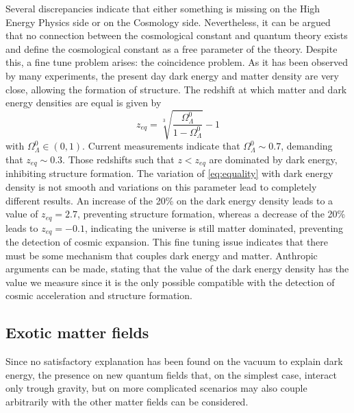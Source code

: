Several discrepancies indicate that either something is missing on the High Energy Physics side or on the Cosmology side. Nevertheless, it can be argued that no connection between the cosmological constant and quantum theory exists and define the cosmological constant as a free parameter of the theory. Despite this, a fine tune problem arises: the coincidence problem. As it has been observed by many experiments, the present day dark energy and matter density are very close, allowing the formation of structure. The redshift at which matter and dark energy densities are equal is given by
\begin{equation}
z_{eq} = \sqrt[3]{\frac{\Omega_\Lambda^0}{1-\Omega_\Lambda^0}}-1
\label{eq:equality}
\end{equation}
with $\Omega_\Lambda^0\in(0,1)$. Current measurements indicate that $\Omega_\Lambda^0\sim0.7$, demanding that $z_{eq}\sim0.3$. Those redshifts such that $z<z_{eq}$ are dominated by dark energy, inhibiting structure formation. The variation of \autoref{eq:equality} with dark energy density is not smooth and variations on this parameter lead to completely different results. An  increase of the 20\% on the dark energy density leads to a value of $z_{eq}=2.7$, preventing structure formation, whereas a decrease of the 20\% leads to $z_{eq}=-0.1$, indicating the universe is still matter dominated, preventing the detection of cosmic expansion. This fine tuning issue indicates that there must be some mechanism that couples dark energy and matter. Anthropic arguments can be made, stating that the value of the dark energy density has the value we measure since it is the only possible compatible with the detection of cosmic acceleration and structure formation.
\subsection{Exotic matter fields}
Since no satisfactory explanation has been found on the vacuum to explain dark energy, the presence on new quantum fields that, on the simplest case, interact only trough gravity, but on more complicated scenarios may also couple arbitrarily with the other matter fields can be considered.
\newline

